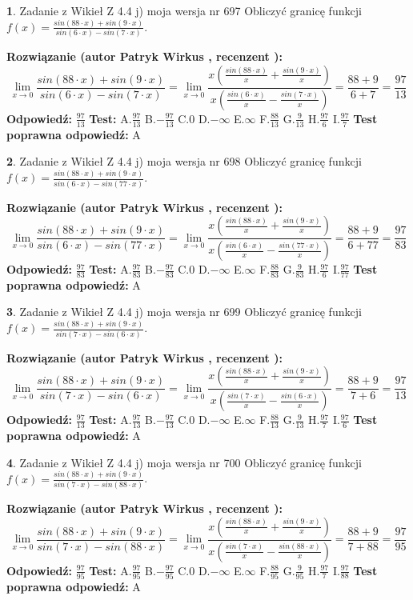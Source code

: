 \documentclass[12pt, a4paper]{article}
\theoremstyle{definition} %
\newtheorem{zad}{}
\newcommand{\zadStart}[1]{\begin{zad}#1\newline}
\newcommand{\zadStop}{\end{zad}}
\newcommand{\rozwStart}[2]{\noindent \textbf{Rozwiązanie (autor #1 , recenzent #2): }\newline}
\newcommand{\rozwStop}{\newline}
\newcommand{\odpStart}{\noindent \textbf{Odpowiedź:}\newline}
\newcommand{\odpStop}{\newline}
\newcommand{\testStart}{\noindent \textbf{Test:}\newline}
\newcommand{\testStop}{\newline}
\newcommand{\kluczStart}{\noindent \textbf{Test poprawna odpowiedź:}\newline}
\newcommand{\kluczStop}{\newline}
\begin{document}
\zadStart{Zadanie z Wikieł Z 4.4 j) moja wersja nr 697}
Obliczyć granicę funkcji $f(x)=\frac{sin(88\cdot x) +sin(9\cdot x)}{sin(6\cdot x) -sin(7\cdot x)}$.
\zadStop
\rozwStart{Patryk Wirkus}{}
$$\lim\limits_{x\to 0}\frac{sin(88\cdot x) +sin(9\cdot x)}{sin(6\cdot x) -sin(7\cdot x)}=\lim\limits_{x\to 0}\frac{x(\frac{sin(88\cdot x)}{x}+\frac{sin(9\cdot x)}{x})}{x(\frac{sin(6\cdot x)}{x}-\frac{sin(7\cdot x)}{x})}=\frac{88+9}{6+7} = \frac{97}{13}$$
\rozwStop
\odpStart
$\frac{97}{13}$
\odpStop
\testStart
A.$\frac{97}{13}$
B.$-\frac{97}{13}$
C.$0$
D.$-\infty$
E.$\infty$
F.$\frac{88}{13}$
G.$\frac{9}{13}$
H.$\frac{97}{6}$
I.$\frac{97}{7}$
\testStop
\kluczStart
A
\kluczStop



\zadStart{Zadanie z Wikieł Z 4.4 j) moja wersja nr 698}
Obliczyć granicę funkcji $f(x)=\frac{sin(88\cdot x) +sin(9\cdot x)}{sin(6\cdot x) -sin(77\cdot x)}$.
\zadStop
\rozwStart{Patryk Wirkus}{}
$$\lim\limits_{x\to 0}\frac{sin(88\cdot x) +sin(9\cdot x)}{sin(6\cdot x) -sin(77\cdot x)}=\lim\limits_{x\to 0}\frac{x(\frac{sin(88\cdot x)}{x}+\frac{sin(9\cdot x)}{x})}{x(\frac{sin(6\cdot x)}{x}-\frac{sin(77\cdot x)}{x})}=\frac{88+9}{6+77} = \frac{97}{83}$$
\rozwStop
\odpStart
$\frac{97}{83}$
\odpStop
\testStart
A.$\frac{97}{83}$
B.$-\frac{97}{83}$
C.$0$
D.$-\infty$
E.$\infty$
F.$\frac{88}{83}$
G.$\frac{9}{83}$
H.$\frac{97}{6}$
I.$\frac{97}{77}$
\testStop
\kluczStart
A
\kluczStop



\zadStart{Zadanie z Wikieł Z 4.4 j) moja wersja nr 699}
Obliczyć granicę funkcji $f(x)=\frac{sin(88\cdot x) +sin(9\cdot x)}{sin(7\cdot x) -sin(6\cdot x)}$.
\zadStop
\rozwStart{Patryk Wirkus}{}
$$\lim\limits_{x\to 0}\frac{sin(88\cdot x) +sin(9\cdot x)}{sin(7\cdot x) -sin(6\cdot x)}=\lim\limits_{x\to 0}\frac{x(\frac{sin(88\cdot x)}{x}+\frac{sin(9\cdot x)}{x})}{x(\frac{sin(7\cdot x)}{x}-\frac{sin(6\cdot x)}{x})}=\frac{88+9}{7+6} = \frac{97}{13}$$
\rozwStop
\odpStart
$\frac{97}{13}$
\odpStop
\testStart
A.$\frac{97}{13}$
B.$-\frac{97}{13}$
C.$0$
D.$-\infty$
E.$\infty$
F.$\frac{88}{13}$
G.$\frac{9}{13}$
H.$\frac{97}{7}$
I.$\frac{97}{6}$
\testStop
\kluczStart
A
\kluczStop



\zadStart{Zadanie z Wikieł Z 4.4 j) moja wersja nr 700}
Obliczyć granicę funkcji $f(x)=\frac{sin(88\cdot x) +sin(9\cdot x)}{sin(7\cdot x) -sin(88\cdot x)}$.
\zadStop
\rozwStart{Patryk Wirkus}{}
$$\lim\limits_{x\to 0}\frac{sin(88\cdot x) +sin(9\cdot x)}{sin(7\cdot x) -sin(88\cdot x)}=\lim\limits_{x\to 0}\frac{x(\frac{sin(88\cdot x)}{x}+\frac{sin(9\cdot x)}{x})}{x(\frac{sin(7\cdot x)}{x}-\frac{sin(88\cdot x)}{x})}=\frac{88+9}{7+88} = \frac{97}{95}$$
\rozwStop
\odpStart
$\frac{97}{95}$
\odpStop
\testStart
A.$\frac{97}{95}$
B.$-\frac{97}{95}$
C.$0$
D.$-\infty$
E.$\infty$
F.$\frac{88}{95}$
G.$\frac{9}{95}$
H.$\frac{97}{7}$
I.$\frac{97}{88}$
\testStop
\kluczStart
A
\kluczStop
\end{document}
